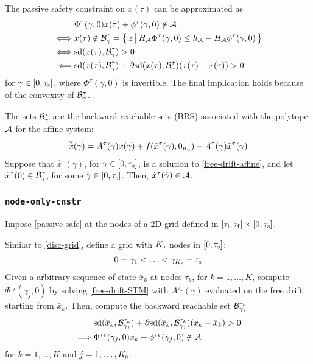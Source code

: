 \documentclass[11pt,a4paper]{article}
\begin{document}
The passive safety constraint on $x(\tau)$ can be approximated as
\begin{align*}
     & \Phi^\tau(\gamma,0)x(\tau) + \phi^\tau(\gamma,0) \notin \mathcal{A}\\
\iff & x(\tau) \notin \mathcal{B}^\tau_\gamma = \big\{\,z\,\big|\,H_{\mathcal{A}}\Phi^\tau(\gamma,0)\le h_{\mathcal{A}}-H_{\mathcal{A}}\phi^\tau(\gamma,0)\,\big\}\\
\iff & \mathrm{sd}(x(\tau),\mathcal{B}^\tau_\gamma) > 0\\
\impliedby & \mathrm{sd}(\bar{x}(\tau),\mathcal{B}^\tau_\gamma) + \partial\mathrm{sd}(\bar{x}(\tau),\mathcal{B}^\tau_\gamma)(x(\tau)-\bar{x}(\tau)) > 0
\end{align*}
for $\gamma\in[0,\tau_{\mathrm{s}}]$, where $\Phi^\tau(\gamma,0)$ is invertible. The final implication holds because of the convexity of $\mathcal{B}^\tau_\gamma$.

The sets $\mathcal{B}^\tau_\gamma$ are the backward reachable sets (BRS) associated with the polytope $\mathcal{A}$ for the affine system:
\begin{align}
    \overset{\diamond}{x}(\gamma) = A^\tau(\gamma)x(\gamma) + f(\bar{x}^\tau(\gamma),0_{n_u})-A^\tau(\gamma)\bar{x}^\tau(\gamma)\label{free-drift-affine}
\end{align}
Suppose that $\hat{x}^\tau(\gamma)$, for $\gamma\in[0,\tau_{\mathrm{s}}]$, is a solution to \eqref{free-drift-affine}, and let $\hat{x}^\tau(0)\in\mathcal{B}^\tau_{\tilde{\gamma}}$, for some $\tilde{\gamma}\in[0,\tau_{\mathrm{s}}]$. Then, $\hat{x}^\tau(\tilde{\gamma}) \in \mathcal{A}$.

\subsubsection{\texttt{node-only-cnstr}}

Impose \eqref{passive-safe} at the nodes of a 2D grid defined in $[\tau_{\mathrm{i}},\tau_{\mathrm{f}}]\times[0,\tau_{\mathrm{s}}]$.

Similar to \eqref{disc-grid}, define a grid with $K_{\mathrm{s}}$ nodes in $[0,\tau_{\mathrm{s}}]$:
\begin{align*}
    0 = \gamma_1 < \ldots < \gamma_{K_{\mathrm{s}}} = \tau_{\mathrm{s}} 
\end{align*}
Given a arbitrary sequence of state $\bar{x}_k$ at nodes $\tau_k$, for $k=1,\ldots,K$, compute $\Phi^{\tau_k}(\gamma_j,0)$ by solving \eqref{free-drift-STM} with $A^{\tau_k}(\gamma)$ evaluated on the free drift starting from $\bar{x}_k$. Then, compute the backward reachable set $\mathcal{B}_{\gamma_j}^{\tau_k}$
\begin{align*}
    & \mathrm{sd}(\bar{x}_k,\mathcal{B}^{\tau_k}_{\gamma_j}) + \partial\mathrm{sd}(\bar{x}_k,\mathcal{B}^{\tau_k}_{\gamma_j})(x_k - \bar{x}_k) > 0\\
    \implies & \Phi^{\tau_k}(\gamma_j,0)x_k + \phi^{\tau_k}(\gamma_j,0) \notin \mathcal{A}\\
\end{align*}
for $k=1,\ldots,K$ and $j=1,\ldots,K_{\mathrm{s}}$.
\end{document}
